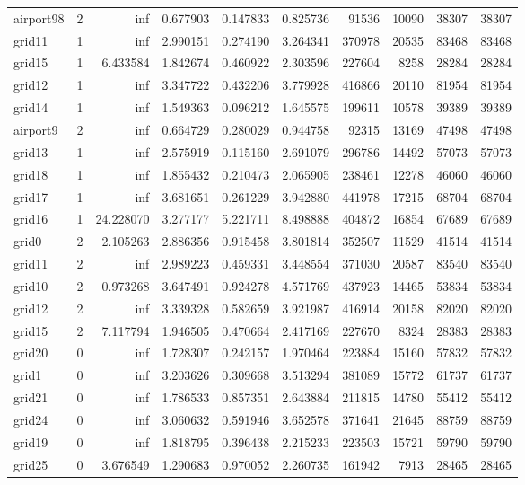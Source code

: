 \begin{longtable}{|l|r|r|r|r|r|r|r|r|r|}
airport98 & 2 & inf & 0.677903 & 0.147833 & 0.825736 & 91536 & 10090 & 38307 & 38307 \\
grid11 & 1 & inf & 2.990151 & 0.274190 & 3.264341 & 370978 & 20535 & 83468 & 83468 \\
grid15 & 1 & 6.433584 & 1.842674 & 0.460922 & 2.303596 & 227604 & 8258 & 28284 & 28284 \\
grid12 & 1 & inf & 3.347722 & 0.432206 & 3.779928 & 416866 & 20110 & 81954 & 81954 \\
grid14 & 1 & inf & 1.549363 & 0.096212 & 1.645575 & 199611 & 10578 & 39389 & 39389 \\
airport9 & 2 & inf & 0.664729 & 0.280029 & 0.944758 & 92315 & 13169 & 47498 & 47498 \\
grid13 & 1 & inf & 2.575919 & 0.115160 & 2.691079 & 296786 & 14492 & 57073 & 57073 \\
grid18 & 1 & inf & 1.855432 & 0.210473 & 2.065905 & 238461 & 12278 & 46060 & 46060 \\
grid17 & 1 & inf & 3.681651 & 0.261229 & 3.942880 & 441978 & 17215 & 68704 & 68704 \\
grid16 & 1 & 24.228070 & 3.277177 & 5.221711 & 8.498888 & 404872 & 16854 & 67689 & 67689 \\
grid0 & 2 & 2.105263 & 2.886356 & 0.915458 & 3.801814 & 352507 & 11529 & 41514 & 41514 \\
grid11 & 2 & inf & 2.989223 & 0.459331 & 3.448554 & 371030 & 20587 & 83540 & 83540 \\
grid10 & 2 & 0.973268 & 3.647491 & 0.924278 & 4.571769 & 437923 & 14465 & 53834 & 53834 \\
grid12 & 2 & inf & 3.339328 & 0.582659 & 3.921987 & 416914 & 20158 & 82020 & 82020 \\
grid15 & 2 & 7.117794 & 1.946505 & 0.470664 & 2.417169 & 227670 & 8324 & 28383 & 28383 \\
grid20 & 0 & inf & 1.728307 & 0.242157 & 1.970464 & 223884 & 15160 & 57832 & 57832 \\
grid1 & 0 & inf & 3.203626 & 0.309668 & 3.513294 & 381089 & 15772 & 61737 & 61737 \\
grid21 & 0 & inf & 1.786533 & 0.857351 & 2.643884 & 211815 & 14780 & 55412 & 55412 \\
grid24 & 0 & inf & 3.060632 & 0.591946 & 3.652578 & 371641 & 21645 & 88759 & 88759 \\
grid19 & 0 & inf & 1.818795 & 0.396438 & 2.215233 & 223503 & 15721 & 59790 & 59790 \\
grid25 & 0 & 3.676549 & 1.290683 & 0.970052 & 2.260735 & 161942 & 7913 & 28465 & 28465 \\

\end{longtable}
